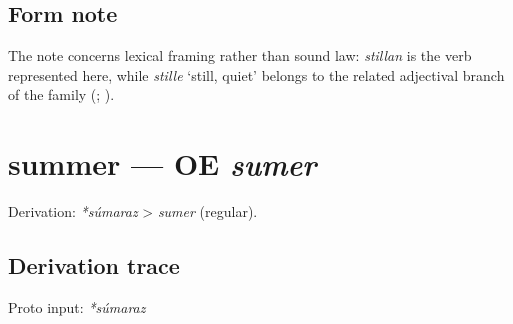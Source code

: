 \documentclass[
  british,
  a4paper,
  openany]{book}
\providecommand{\texorpdfstring}[2]{#1}
\begin{document}
\subsection{Form note}\label{form-note-20}

The note concerns lexical framing rather than sound law: \emph{stillan}
is the verb represented here, while {\emph{stille}} `still, quiet'
belongs to the related adjectival branch of the family
(;
).

\section{\texorpdfstring{summer --- OE
\emph{sumer}}{summer --- OE sumer}}\label{summer-oe-sumer}


Derivation: \emph{*súmaraz} \textgreater{} \emph{sumer} (regular).

\subsection{Derivation trace}\label{derivation-trace-51}

Proto input: \emph{*súmaraz}

\begingroup
\setlength{\fboxsep}{6pt}
\end{document}
